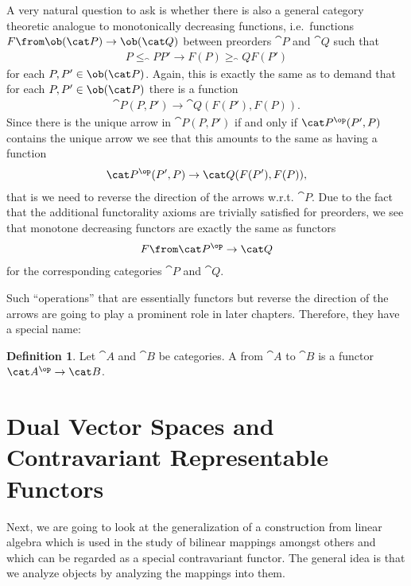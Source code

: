 \documentclass{article}
\theoremstyle{definition}
\newtheorem{definition}{Definition}
\begin{document}
A very natural question to ask is whether there is also a general category theoretic analogue to monotonically decreasing functions, i.e.\ functions $F\from\ob(\cat P)\to\ob(\cat Q)$ between preorders $\cat P$ and $\cat Q$ such that
\begin{align*}
  P\leq_\cat P P'\rightarrow F(P)\geq_\cat Q F(P')
\end{align*}
for each $P,P'\in\ob(\cat P)$. Again, this is exactly the same as to demand that for each $P,P'\in\ob(\cat P)$ there is a function
\begin{align*}
  \cat P(P,P')\to\cat Q(F(P'),F(P)).
\end{align*}
Since there is the unique arrow in $\cat P(P,P')$ if and only if $\cat P^\op(P',P)$ contains the unique arrow we see that this amounts to the same as having a function
\begin{align*}
  \cat P^\op(P',P)\to\cat Q(F(P'),F(P)),
\end{align*}
that is we need to reverse the direction of the arrows w.r.t. $\cat P$. Due to the fact that the additional functorality axioms are trivially satisfied for preorders, we see that monotone decreasing functors are exactly the same as functors
\begin{align*}
  F\from\cat P^\op\to\cat Q
\end{align*}
for the corresponding categories $\cat P$ and $\cat Q$.

Such ``operations'' that are essentially functors but reverse the direction of the arrows are going to play a prominent role in later chapters. Therefore, they have a special name:
\begin{definition}
  Let $\cat A$ and $\cat B$ be categories. A  from $\cat A$ to $\cat B$ is a functor $\cat A^\op\to\cat B$.
\end{definition}
\section{Dual Vector Spaces and Contravariant Representable Functors}
Next, we are going to look at the generalization of a construction from linear algebra which is used in the study of bilinear mappings amongst others and which can be regarded as a special contravariant functor. The general idea is that we analyze objects by analyzing the mappings into them.
\end{document}
